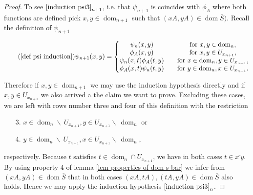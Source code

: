 \documentclass[b5paper,draft,openbib,12pt]{memoir}
\DeclareMathOperator{\dom}{dom}
\begin{document}
\begin{proof}
To see \(\eqref{induction psi3}_{n+1}\), i.e. that  \(\psi_{n+1}\) is 
coincides with \(\phi_A\) where both functions are defined pick 
\(x,y\in \dom_{n+1}\) such that \((xA,yA)\in\dom\overline{S})\).
Recall the definition of \(\psi_{n+1}\)

\begin{equation}\tag{\ref{def psi induction}}
  \psi_{n+1}(x,y)=\left\{\begin{matrix}
  \psi_n(x,y) \quad &\text{for }x,y\in \dom_n,\\
  \phi_A(x,y) \quad &\text{for } x,y\in U_{x_{n+1}},\\
  \psi_n(x,t)\phi_A(t,y)\quad &\text{for } x\in \dom_n, y\in U_{x_{n+1}},\\
  \phi_A(x,t)\psi_n(t,y)\quad &\text{for } y\in \dom_n, x\in U_{x_{n+1}}.
  \end{matrix} \right.
\end{equation} 

Therefore if \(x,y\in\dom_{n+1}\) we may use the induction hypothesis directly
and if \(x,y\in U_{x_{n+1}}\) we also arrived a the claim we want to prove.
Excluding these cases, we are left with rows number three and four of this
definition with the restriction
\begin{enumerate}
  \item[3.] \(x\in \dom_n\backslash~ U_{x_{n+1}}, y\in U_{x_{n+1}}\backslash~ \dom_n \) or
  \item[4.] \(y\in \dom_n\backslash~ U_{x_{n+1}}, x\in U_{x_{n+1}}\backslash~ \dom_n \),
\end{enumerate}
respectively.
Because \(t\) satisfies
\(t\in \dom_n\cap U_{x_{n+1}}\), we have in both cases \(t\in \overline{x~y}\).
By using property 4 of lemma \ref{lem properties of dom s bar} we infer 
from \((xA,yA)\in \dom\overline{S}\) that in both cases
 \((xA, t A),(tA, y A)\in \dom \overline{S}\)
also holds. Hence we may apply the induction hypothesis 
\(\eqref{induction psi3}_{n}\).


\end{proof}
\end{document}

